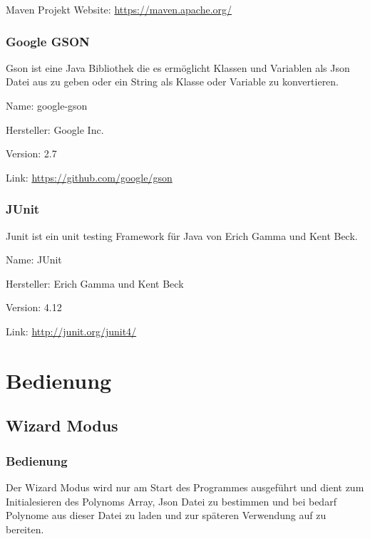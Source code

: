 \documentclass[letterpaper,10pt,ngerman]{sphinxmanual}
\begin{document}
Maven Projekt Website: \url{https://maven.apache.org/}


\subsection{Google GSON}
\label{intro:google-gson}
Gson ist eine Java Bibliothek die es ermöglicht Klassen und Variablen als Json Datei aus zu geben oder
ein String als Klasse oder Variable zu konvertieren.

\begin{DUlineblock}{0em}
\item[] Name: google-gson
\item[] Hersteller: Google Inc.
\item[] Version: 2.7
\item[] Link: \url{https://github.com/google/gson}
\end{DUlineblock}


\subsection{JUnit}
\label{intro:junit}
Junit ist ein unit testing Framework für Java von Erich Gamma und Kent Beck.

\begin{DUlineblock}{0em}
\item[] Name: JUnit
\item[] Hersteller: Erich Gamma und Kent Beck
\item[] Version: 4.12
\item[] Link: \url{http://junit.org/junit4/}
\end{DUlineblock}


\chapter{Bedienung}
\label{index:bedienung}

\section{Wizard Modus}
\label{wizard:wizard-modus}\label{wizard::doc}

\subsection{Bedienung}
\label{wizard:bedienung}
Der Wizard Modus wird nur am Start des Programmes ausgeführt und dient zum Initialesieren
des Polynoms Array, Json Datei zu bestimmen und bei bedarf Polynome aus dieser Datei zu laden
und zur späteren Verwendung auf zu bereiten.
\end{document}
